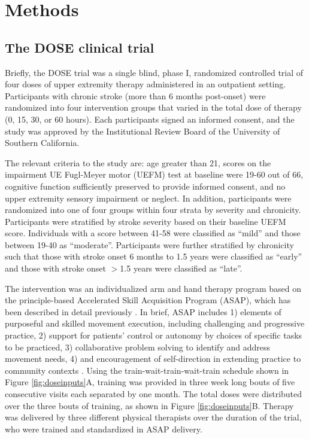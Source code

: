 \section{Methods}

\subsection{The DOSE clinical trial}
Briefly, the DOSE trial was a single blind, phase I, randomized controlled trial of four doses of upper extremity therapy administered in an outpatient setting.  
Participants with chronic stroke (more than 6 months post-onset) were randomized into four intervention groups that varied in the total dose of therapy (0, 15, 30, or 60 hours).  
Each participants signed an informed consent, and the study was approved by the Institutional Review Board of the University of Southern California.

The relevant criteria to the study are: age greater than 21, scores on the impairment UE Fugl-Meyer motor (UEFM) test at baseline were 19-60 out of 66, cognitive function sufficiently preserved to provide informed consent, and no upper extremity sensory impairment or neglect. 
In addition, participants were randomized into one of four groups within four strata by severity and chronicity.  
Participants were stratified by stroke severity based on their baseline UEFM score.  
Individuals with a score between 41-58 were classified as “mild” and those between 19-40 as “moderate”.  
Participants were further stratified by chronicity such that those with stroke onset 6 months to 1.5 years were classified as “early” and those with stroke onset $ > $1.5 years were classified as “late”. 

The intervention was an individualized arm and hand therapy program based on the principle-based Accelerated Skill Acquisition Program (ASAP), which has been described in detail previously \cite{Winstein2014}. 
In brief, ASAP includes 1) elements of purposeful and skilled movement execution, including challenging and progressive practice, 2) support for patients’ control or autonomy by choices of specific tasks to be practiced, 3) collaborative problem solving to identify and address movement needs, 4) and encouragement of self-direction in extending practice to community contexts \cite{Winstein2014}. 
Using the train-wait-train-wait-train schedule shown in Figure \ref{fig:doseinputs}A, training was provided in three week long bouts of five consecutive visits each separated by one month. 
The total doses were distributed over the three bouts of training, as shown in Figure \ref{fig:doseinputs}B. 
Therapy was delivered by three different physical therapists over the duration of the trial, who were trained and standardized in ASAP delivery. 

